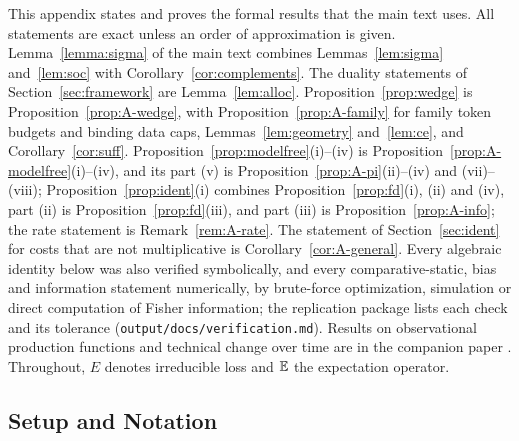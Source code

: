 This appendix states and proves the formal results that the main text uses. All statements are exact unless an order of
approximation is given. Lemma~\ref{lemma:sigma} of the main text combines Lemmas~\ref{lem:sigma} and~\ref{lem:soc} with
Corollary~\ref{cor:complements}. The duality statements of Section~\ref{sec:framework} are Lemma~\ref{lem:alloc}.
Proposition~\ref{prop:wedge} is Proposition~\ref{prop:A-wedge}, with Proposition~\ref{prop:A-family} for family token
budgets and binding data caps, Lemmas~\ref{lem:geometry} and~\ref{lem:ce}, and Corollary~\ref{cor:suff}.
Proposition~\ref{prop:modelfree}(i)--(iv) is Proposition~\ref{prop:A-modelfree}(i)--(iv), and its part (v) is
Proposition~\ref{prop:A-pi}(ii)--(iv) and (vii)--(viii); Proposition~\ref{prop:ident}(i) combines
Proposition~\ref{prop:fd}(i), (ii) and (iv), part (ii) is Proposition~\ref{prop:fd}(iii), and part (iii) is
Proposition~\ref{prop:A-info}; the rate statement is Remark~\ref{rem:A-rate}. The statement of Section~\ref{sec:ident}
for costs that are not multiplicative is Corollary~\ref{cor:A-general}. Every algebraic identity below was also verified symbolically, and every
comparative-static, bias and information statement numerically, by brute-force optimization, simulation or direct
computation of Fisher information; the replication package lists each check and its tolerance
(\texttt{output/docs/verification.md}). Results on observational production functions and technical change over time
are in the companion paper \citep{okar2026observational}. Throughout, $E$ denotes irreducible loss and $\mathbb{E}$ the expectation operator.

\subsection{Setup and Notation}\label{app:setup}

